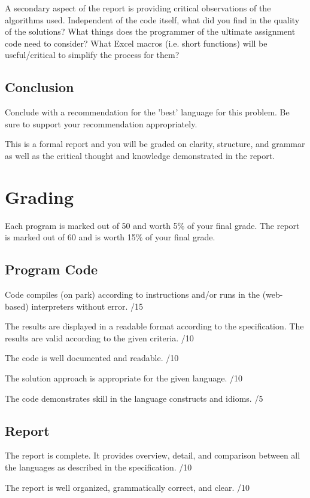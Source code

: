 \documentclass[12pt,info]{asg}
\begin{document}
A secondary aspect of the report is providing critical observations of the algorithms used. Independent of the code itself, what did you find in the quality of the solutions? What things does the programmer of the ultimate assignment code need to consider? What Excel macros (i.e. short functions) will be useful/critical to simplify the process for them?

\subsection*{Conclusion}
Conclude with a recommendation for the 'best' language for this problem. Be sure to support your recommendation appropriately.

This is a formal report and you will be graded on clarity, structure, and grammar as well as the critical thought and  knowledge demonstrated in the report.


\section*{Grading}

Each program is marked out of 50 and worth 5\% of your final grade. The report is marked out of 60 and is worth 15\% of your final grade.

\subsection*{Program Code}
Code compiles (on park) according to instructions and/or runs in the (web-based) interpreters without error. /15

The results are displayed in a readable format according to the specification. The results are valid according to the given criteria. /10

The code is well documented and readable. /10

The solution approach is appropriate for the given language. /10

The code demonstrates skill in the language constructs and idioms. /5

\subsection*{Report}
The report is complete. It provides overview, detail, and comparison between all the languages as described in the specification. /10

The report is well organized, grammatically correct, and clear. /10
\end{document}
